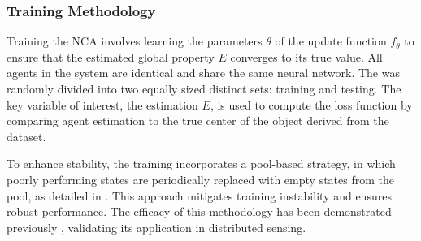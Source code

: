 \subsubsection{Training Methodology}

Training the \ac{NCA} involves learning the parameters $\theta$ of the update function $f_\theta$ to ensure that the estimated global property $E$ converges to its true value. All agents in the system are identical and share the same neural network. The was randomly divided into two equally sized distinct sets: training and testing. The key variable of interest, the estimation $E$, is used to compute the loss function by comparing agent estimation to the true center of the object derived from the dataset.


To enhance stability, the training incorporates a pool-based strategy, in which poorly performing states are periodically replaced with empty states from the pool, as detailed in \cite{mordvintsev_growing_2020}. %
This approach mitigates training instability and ensures robust performance. The efficacy of this methodology has been demonstrated previously \cite{bessone_neural_2025}, validating its application in distributed sensing.


